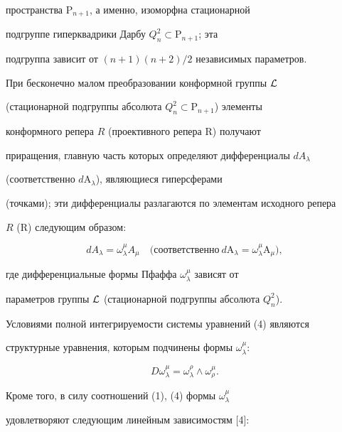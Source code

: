 пространства $\mathrm P_{n+1}$, а именно, изоморфна стационарной 


подгруппе гиперквадрики Дарбу $Q^2_n\subset\mathrm P_{n+1}$; эта 


подгруппа зависит от ${(n+1)(n+2)}/{2}$ независимых параметров. 


 


При бесконечно малом преобразовании конформной группы $\cal L$ 


(стационарной подгруппы абсолюта $Q^2_n\subset\mathrm P_{n+1}$) элементы 


конформного репера $R$ (проективного репера $\mathrm R$) получают 


приращения, главную часть которых определяют дифференциалы $dA_\lambda$ 


(соответственно  $d\mathrm A_\lambda$), являющиеся гиперсферами 


(точками); эти дифференциалы разлагаются по элементам исходного репера 


$R$ ($\mathrm R$) следующим образом: 


\begin{equation} 


dA_\lambda=\omega^\mu_\lambda A_\mu\quad 


\text{(соответственно}\ d\mathrm A_\lambda= 


\omega^\mu_\lambda\mathrm A_\mu), 


\end{equation} 


где дифференциальные формы Пфаффа $\omega^\mu_\lambda$ зависят от 


параметров группы $\cal L$ (стационарной подгруппы абсолюта $Q^2_n$). 


 


Условиями полной интегрируемости системы уравнений (4) являются 


структурные уравнения, которым подчинены формы $\omega^\mu_\lambda$: 


\begin{equation} 


D\omega^\mu_\lambda=\omega^\rho_\lambda\wedge\omega^\mu_\rho. 


\end{equation} 


Кроме того, в силу соотношений (1), (4) формы $\omega^\mu_\lambda$ 


удовлетворяют следующим линейным зависимостям [4]: 


